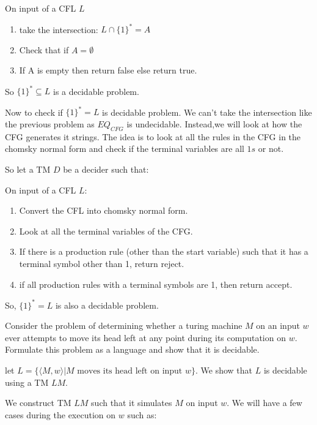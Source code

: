 \documentclass[12pt]{exam}
\begin{document}
\begin{questions}
\begin{solution}
    On input of a CFL $L$
    \begin{enumerate}[1.]
      \item take the intersection: $L\cap \{1\}^{*} = A$
      \item Check that if $A=\emptyset$
      \item If A is empty then return false else return true.
    \end{enumerate}

    So $\{1\}^{*}\subseteq L$ is a decidable problem.


    Now to check if $\{1\}^{*} = L$ is decidable problem.
    We can't take the intersection like the previous problem as $EQ_{CFG}$ is undecidable.
    Instead,we will look at how the CFG generates it strings. The idea is to look at all the rules in the CFG in the chomsky normal form and check if the terminal variables are all $1s$ or not.

    So let a TM $D$ be a decider such that:

    On input of a CFL $L$:
    \begin{enumerate}
      \item Convert the CFL into chomsky normal form.
      \item Look at all the terminal variables of the CFG.
      \item If there is a production rule (other than the start variable) such
            that it has a terminal symbol other than 1, return reject.
      \item if all production rules with a terminal symbols are 1, then return accept.
    \end{enumerate}

    So, $\{1\}^{*} = L$ is also a decidable problem.


  \end{solution}

  \question{}
  Consider the problem of determining whether a turing machine $M$ on an input $w$ ever attempts to move its head left at any point during its computation on $w$. Formulate this problem as a language and show that it is decidable.

  \begin{solution}

    let $L=\{\langle M,w\rangle| M \text{ moves its head left on input } w\}$. We show that $L$ is decidable using a TM $LM$.

    We construct TM $LM$ such that it simulates $M$ on input $w$. We will have a few cases during the execution on $w$ such as:


\end{solution}
\end{questions}
\end{document}
